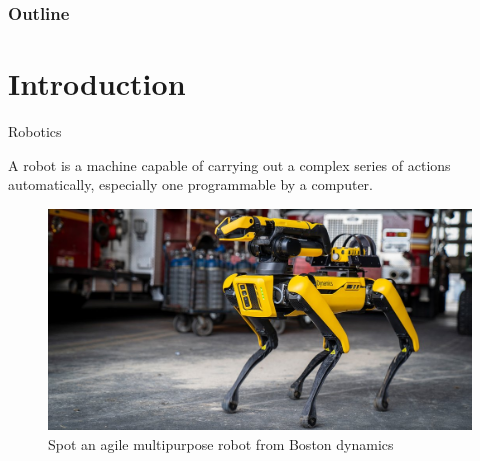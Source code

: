 \documentclass{beamer}
\begin{document}
\begin{frame}
    \maketitle
\end{frame}

\begin{frame}
    \frametitle{Outline}

    \tableofcontents

\end{frame}

\section{Introduction}
\begin{frame}{Robotics}
    \begin{defn}
        A robot is a machine capable of carrying out a complex series of actions
        automatically, especially one programmable by a computer.
    \end{defn}
    \begin{figure}[H]
        \centering
        \includegraphics[scale=.25]{../images/boston-dynamics-spot}
        \caption[Boston dynamics robot (spot)]{Spot an agile multipurpose robot from Boston dynamics}
    \end{figure}
\end{frame}
\end{document}
